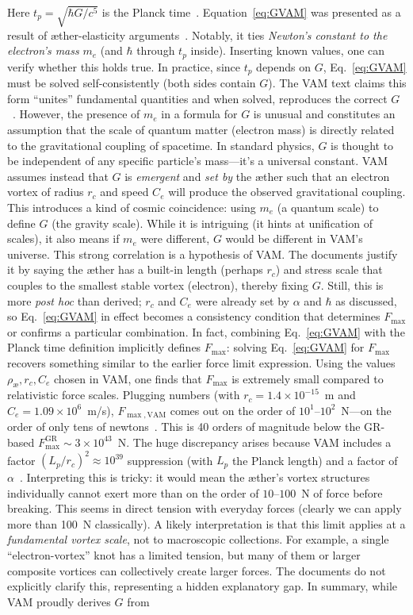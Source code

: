 \documentclass[a4paper,12pt]{article}
\begin{document}
\begin{itemize}
Here $t_p=\sqrt{\hbar G/c^5}$ is the Planck time~\cite{vamcore}. Equation~\eqref{eq:GVAM} was presented as a result of æther-elasticity arguments~\cite{vamcore}. Notably, it ties \textit{Newton's constant to the electron's mass} $m_e$ (and $\hbar$ through $t_p$ inside). Inserting known values, one can verify whether this holds true. In practice, since $t_p$ depends on $G$, Eq.~\eqref{eq:GVAM} must be solved self-consistently (both sides contain $G$). The VAM text claims this form ``unites'' fundamental quantities and when solved, reproduces the correct $G$~\cite{vamcore}. However, the presence of $m_e$ in a formula for $G$ is unusual and constitutes an assumption that the scale of quantum matter (electron mass) is directly related to the gravitational coupling of spacetime. In standard physics, $G$ is thought to be independent of any specific particle's mass---it's a universal constant. VAM assumes instead that $G$ is \textit{emergent} and \textit{set by} the æther such that an electron vortex of radius $r_c$ and speed $C_e$ will produce the observed gravitational coupling. This introduces a kind of cosmic coincidence: using $m_e$ (a quantum scale) to define $G$ (the gravity scale). While it is intriguing (it hints at unification of scales), it also means if $m_e$ were different, $G$ would be different in VAM's universe. This strong correlation is a hypothesis of VAM. The documents justify it by saying the æther has a built-in length (perhaps $r_c$) and stress scale that couples to the smallest stable vortex (electron), thereby fixing $G$. Still, this is more \textit{post hoc} than derived; $r_c$ and $C_e$ were already set by $\alpha$ and $\hbar$ as discussed, so Eq.~\eqref{eq:GVAM} in effect becomes a consistency condition that determines $F_{\max}$ or confirms a particular combination. In fact, combining Eq.~\eqref{eq:GVAM} with the Planck time definition implicitly defines $F_{\max}$: solving Eq.~\eqref{eq:GVAM} for $F_{\max}$ recovers something similar to the earlier force limit expression. Using the values $\rho_{\text{\ae}}, r_c, C_e$ chosen in VAM, one finds that $F_{\max}$ is extremely small compared to relativistic force scales. Plugging numbers (with $r_c=1.4\times10^{-15}$~m and $C_e=1.09\times10^6$~m/s), $F_{\max,\text{VAM}}$ comes out on the order of $10^1$--$10^2$~N---on the order of only tens of newtons~\cite{vamfit}. This is 40 orders of magnitude below the GR-based $F_{\max}^{\text{GR}}\sim3\times10^{43}$~N. The huge discrepancy arises because VAM includes a factor $(L_p/r_c)^2 \approx 10^{39}$ suppression (with $L_p$ the Planck length) and a factor of $\alpha$~\cite{vamfit}. Interpreting this is tricky: it would mean the æther's vortex structures individually cannot exert more than on the order of $10$--$100$~N of force before breaking. This seems in direct tension with everyday forces (clearly we can apply more than 100~N classically). A likely interpretation is that this limit applies at a \textit{fundamental vortex scale}, not to macroscopic collections. For example, a single ``electron-vortex'' knot has a limited tension, but many of them or larger composite vortices can collectively create larger forces. The documents do not explicitly clarify this, representing a hidden explanatory gap. In summary, while VAM proudly derives $G$ from 
\end{itemize}
\end{document}
